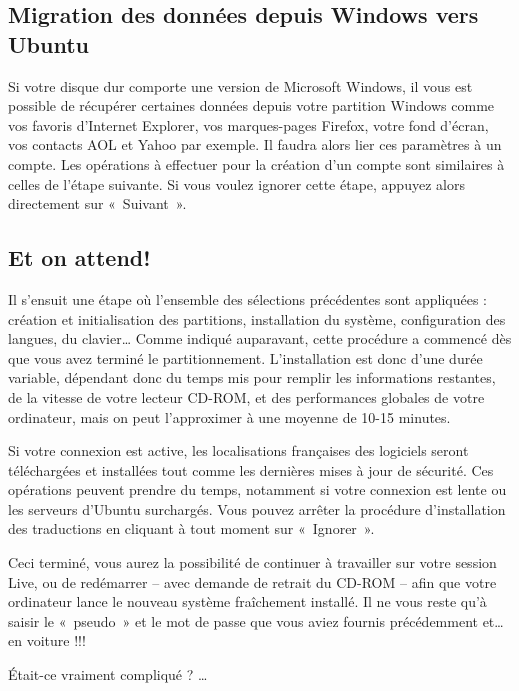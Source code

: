 \subsection{Migration des données depuis Windows vers Ubuntu}
Si votre disque dur comporte une version de Microsoft Windows, il vous est possible de récupérer certaines données depuis votre partition Windows comme vos favoris d'Internet Explorer, vos marques-pages Firefox, votre fond d'écran, vos contacts AOL et Yahoo par exemple. Il faudra alors lier ces paramètres à un compte. Les opérations à effectuer pour la création d'un compte sont similaires à celles de l'étape suivante. Si vous voulez ignorer cette étape, appuyez alors directement sur «~Suivant~».\par
\subsection{Et on attend!}
Il s'ensuit une étape où l'ensemble des sélections précédentes sont appliquées : création et initialisation des partitions, installation du système, configuration des langues, du clavier\ldots{} Comme indiqué auparavant, cette procédure a commencé dès que vous avez terminé le partitionnement. L'installation est donc d'une durée variable, dépendant donc du temps mis pour remplir les informations restantes, de la vitesse de votre lecteur CD-ROM, et des performances globales de votre ordinateur, mais on peut l'approximer à une moyenne de 10-15 minutes.\par
{}
Si votre connexion  est active, les localisations françaises des logiciels seront téléchargées et installées tout comme les dernières mises à jour de sécurité. Ces opérations peuvent prendre du temps, notamment si votre connexion est lente ou les serveurs d'Ubuntu surchargés. Vous pouvez arrêter la procédure d'installation des traductions en cliquant à tout moment sur «~Ignorer~».\par
{}
Ceci terminé, vous aurez la possibilité de continuer à travailler sur votre session Live, ou de redémarrer -- avec demande de retrait du CD-ROM -- afin que votre ordinateur lance le nouveau système fraîchement installé. Il ne vous reste qu'à saisir le «~pseudo~» et le mot de passe que vous aviez fournis précédemment et\ldots{} en voiture !!!\par
{}
Était-ce vraiment compliqué ? \ldots{}
